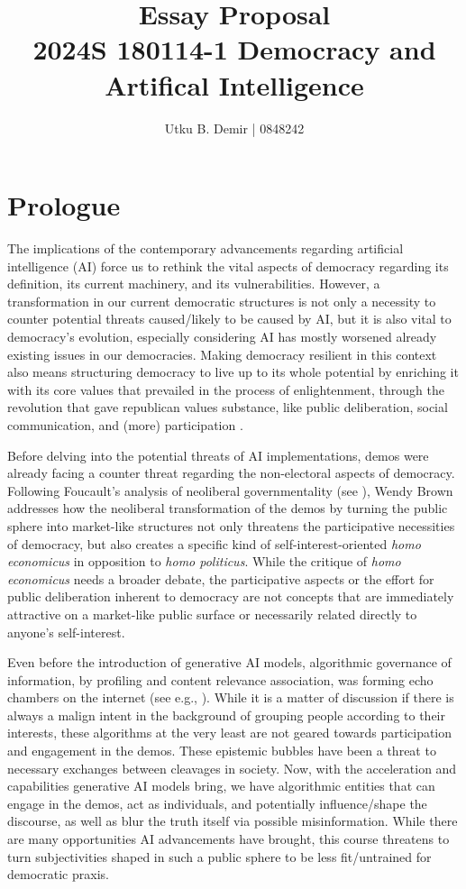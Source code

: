 \documentclass[nobib]{tufte-book}
\title{Essay Proposal \\ 
\large 2024S 180114-1 Democracy and Artifical Intelligence}
\author{Utku B. Demir | 0848242}
\theoremstyle{mytheoremstyle}
\theoremstyle{mytheoremstyle}
\theoremstyle{myproblemstyle}
\begin{document}
    \maketitle

\section{Prologue}
The implications of the contemporary advancements regarding artificial intelligence (AI) force us to rethink the vital aspects of democracy regarding its definition, its current machinery, and its vulnerabilities. However, a transformation in our current democratic structures is not only a necessity to counter potential threats caused/likely to be caused by AI, but it is also vital to democracy's evolution, especially considering AI has mostly worsened already existing issues in our democracies. Making democracy resilient in this context also means structuring democracy to live up to its whole potential by enriching it with its core values that prevailed in the process of enlightenment, through the revolution that gave republican values substance, like public deliberation, social communication, and (more) participation \parencite{coeckelbergh2024}.

Before delving into the potential threats of AI implementations, demos were already facing a counter threat regarding the non-electoral aspects of democracy. Following Foucault's analysis of neoliberal governmentality (see \cite{foucault2008a, Foucault1995}), Wendy Brown \parencite{brown2015} addresses how the neoliberal transformation of the demos by turning the public sphere into market-like structures not only threatens the participative necessities of democracy, but also creates a specific kind of self-interest-oriented \textit{homo economicus} in opposition to \textit{homo politicus}. While the critique of \textit{homo economicus} needs a broader debate, the participative aspects or the effort for public deliberation inherent to democracy are not concepts that are immediately attractive on a market-like public surface or necessarily related directly to anyone's self-interest.

Even before the introduction of generative AI models, algorithmic governance of information, by profiling and content relevance association, was forming echo chambers on the internet (see e.g., \cite{Cheney2011, Otterlo2013, Just2017}). While it is a matter of discussion if there is always a malign intent in the background of grouping people according to their interests, these algorithms at the very least are not geared towards participation and engagement in the demos. These epistemic bubbles have been a threat to necessary exchanges between cleavages in society. Now, with the acceleration and capabilities generative AI models bring, we have algorithmic entities that can engage in the demos, act as individuals, and potentially influence/shape the discourse, as well as blur the truth itself via possible misinformation. While there are many opportunities AI advancements have brought, this course threatens to turn subjectivities shaped in such a public sphere to be less fit/untrained for democratic praxis.
\end{document}
